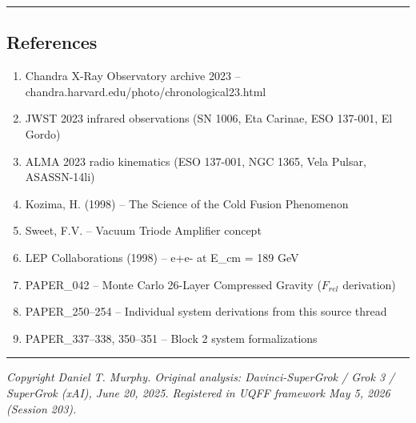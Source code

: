 \documentclass[
  11pt,
]{article}
\providecommand{\tightlist}{%
  \setlength{\itemsep}{0pt}\setlength{\parskip}{0pt}}
\begin{document}
\begin{center}\rule{0.5\linewidth}{0.5pt}\end{center}

\subsection{References}\label{references}

\begin{enumerate}
\def\labelenumi{\arabic{enumi}.}
\tightlist
\item
  Chandra X-Ray Observatory archive 2023 --
  chandra.harvard.edu/photo/chronological23.html
\item
  JWST 2023 infrared observations (SN 1006, Eta Carinae, ESO 137-001, El
  Gordo)
\item
  ALMA 2023 radio kinematics (ESO 137-001, NGC 1365, Vela Pulsar,
  ASASSN-14li)
\item
  Kozima, H. (1998) -- The Science of the Cold Fusion Phenomenon
\item
  Sweet, F.V. -- Vacuum Triode Amplifier concept
\item
  LEP Collaborations (1998) -- e+e- at E\_cm = 189 GeV
\item
  PAPER\_042 -- Monte Carlo 26-Layer Compressed Gravity (\(F_{rel}\)
  derivation)
\item
  PAPER\_250--254 -- Individual system derivations from this source
  thread
\item
  PAPER\_337--338, 350--351 -- Block 2 system formalizations
\end{enumerate}

\begin{center}\rule{0.5\linewidth}{0.5pt}\end{center}

\emph{Copyright Daniel T. Murphy. Original analysis: Davinci-SuperGrok /
Grok 3 / SuperGrok (xAI), June 20, 2025. Registered in UQFF framework
May 5, 2026 (Session 203).}
\end{document}

